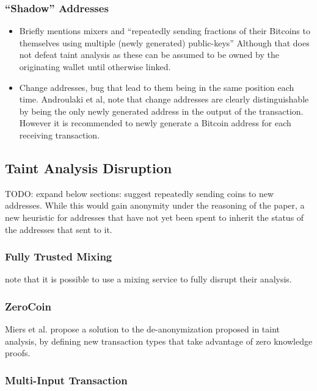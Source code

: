 \subsubsection{``Shadow'' Addresses}


\begin{itemize} \item Briefly mentions mixers and ``repeatedly sending fractions
        of their Bitcoins to themselves using multiple (newly generated)
    public-keys'' Although that does not defeat taint analysis as these can be
assumed to be owned by the originating wallet until otherwise linked.  \item
    Change addresses, bug that lead to them being in the same position each
    time.  Androulaki et al, note that change addresses are clearly
    distinguishable by being the only newly generated address in the output of
    the transaction.  However it is recommended to newly generate a Bitcoin
    address for each receiving transaction.  \end{itemize}

\subsection{Taint Analysis Disruption}
TODO: expand below sections:
\textcite{reid-anon} suggest repeatedly sending coins to new addresses.
While this would gain anonymity under the reasoning of the paper, a new
heuristic for addresses that have not yet been spent to inherit the status
of the addresses that sent to it.

\subsubsection{Fully Trusted Mixing}
\textcite{eval-priv} note that it is possible to use a mixing service
to fully disrupt their analysis.

\subsubsection{ZeroCoin} Miers et al.
propose a solution to the de-anonymization proposed in taint analysis, by
defining new transaction types that take advantage of zero knowledge
proofs\cite{zerocoin}.  \subsubsection{Multi-Input Transaction}

